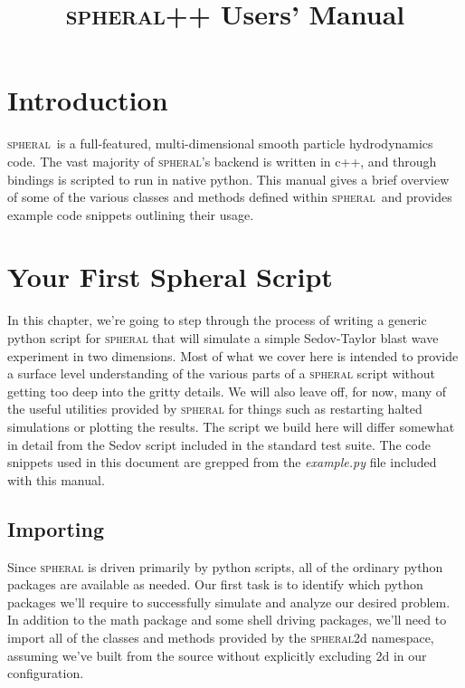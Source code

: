 \documentclass[11pt]{memoir}
\title{\textsc{spheral}++ Users' Manual}
\newcommand{\sph}{\textsc{spheral}}
\begin{document}
\frontmatter
\maketitle
\tableofcontents*


\mainmatter
\chapter{Introduction}

\sph\ is a full-featured, multi-dimensional smooth particle hydrodynamics code. 
The vast majority of \sph's backend is written in c++, and through bindings is scripted to run in native python. 
This manual gives a brief overview of some of the various classes and methods defined within \sph\ and provides example code snippets outlining their usage.

\chapter{Your First Spheral Script}

\lstset{basicstyle=\small,style=myCustomPythonStyle}

In this chapter, we're going to step through the process of writing a generic python script for \textsc{spheral} that will simulate a simple Sedov-Taylor blast wave experiment in two dimensions. 
Most of what we cover here is intended to provide a surface level understanding of the various parts of a \textsc{spheral} script without getting too deep into the gritty details. 
We will also leave off, for now, many of the useful utilities provided by \textsc{spheral} for things such as restarting halted simulations or plotting the results. 
The script we build here will differ somewhat in detail from the Sedov script included in the standard test suite. 
The code snippets used in this document are grepped from the \textit{example.py} file included with this manual.

\section{Importing}

Since \textsc{spheral} is driven primarily by python scripts, all of the ordinary python packages are available as needed. 
Our first task is to identify which python packages we'll require to successfully simulate and analyze our desired problem. 
In addition to the math package and some shell driving packages, we'll need to import all of the classes and methods provided by the \textsc{spheral}2d namespace, assuming we've built from the source without explicitly excluding 2d in our configuration.
\end{document}
